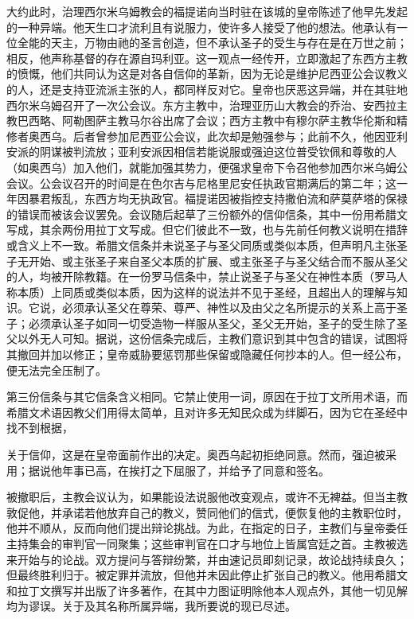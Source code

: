 大约此时，治理西尔米乌姆教会的福提诺向当时驻在该城的皇帝陈述了他早先发起的一种异端。他天生口才流利且有说服力，使许多人接受了他的想法。他承认有一位全能的天主，万物由祂的圣言创造，但不承认圣子的受生与存在是在万世之前；相反，他声称基督的存在源自玛利亚。这一观点一经传开，立即激起了东西方主教的愤慨，他们共同认为这是对各自信仰的革新，因为无论是维护尼西亚公会议教义的人，还是支持亚流派主张的人，都同样反对它。皇帝也厌恶这异端，并在其驻地西尔米乌姆召开了一次公会议。东方主教中，治理亚历山大教会的乔治、安西拉主教巴西略、阿勒图萨主教马尔谷出席了会议；西方主教中有穆尔萨主教华伦斯和精修者奥西乌。后者曾参加尼西亚公会议，此次却是勉强参与；此前不久，他因亚利安派的阴谋被判流放；亚利安派因相信若能说服或强迫这位普受钦佩和尊敬的人（如奥西乌）加入他们，就能加强其势力，便强求皇帝下令召他参加西尔米乌姆公会议。公会议召开的时间是在色尔吉与尼格里尼安任执政官期满后的第二年；这一年因暴君叛乱，东西方均无执政官。福提诺因被指控支持撒伯流和萨莫萨塔的保禄的错误而被该会议罢免。会议随后起草了三份额外的信仰信条，其中一份用希腊文写成，其余两份用拉丁文写成。但它们彼此不一致，也与先前任何教义说明在措辞或含义上不一致。希腊文信条并未说圣子与圣父同质或类似本质，但声明凡主张圣子无开始、或主张圣子来自圣父本质的扩展、或主张圣子与圣父结合而不服从圣父的人，均被开除教籍。在一份罗马信条中，禁止说圣子与圣父在神性本质（罗马人称本质）上同质或类似本质，因为这样的说法并不见于圣经，且超出人的理解与知识。它说，必须承认圣父在尊荣、尊严、神性以及由父之名所提示的关系上高于圣子；必须承认圣子如同一切受造物一样服从圣父，圣父无开始，圣子的受生除了圣父以外无人可知。据说，这份信条完成后，主教们意识到其中包含的错误，试图将其撤回并加以修正；皇帝威胁要惩罚那些保留或隐藏任何抄本的人。但一经公布，便无法完全压制了。\par

第三份信条与其它信条含义相同。它禁止使用一词，原因在于拉丁文所用术语，而希腊文术语因教父们用得太简单，且对许多无知民众成为绊脚石，因为它在圣经中找不到根据，\par

关于信仰，这是在皇帝面前作出的决定。奥西乌起初拒绝同意。然而，强迫被采用；据说他年事已高，在挨打之下屈服了，并给予了同意和签名。\par

被撤职后，主教会议认为，如果能设法说服他改变观点，或许不无裨益。但当主教敦促他，并承诺若他放弃自己的教义，赞同他们的信式，便恢复他的主教职位时，他并不顺从，反而向他们提出辩论挑战。为此，在指定的日子，主教们与皇帝委任主持集会的审判官一同聚集；这些审判官在口才与地位上皆属宫廷之首。主教被选来开始与的论战。双方提问与答辩纷繁，并由速记员即刻记录，故论战持续良久；但最终胜利归于。被定罪并流放，但他并未因此停止扩张自己的教义。他用希腊文和拉丁文撰写并出版了许多著作，在其中力图证明除他本人观点外，其他一切见解均为谬误。关于及其名称所属异端，我所要说的现已尽述。\par

